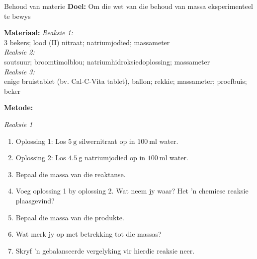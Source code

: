             \begin{i_experiment}{Behoud van materie}
            \nopagebreak
            \label{m38711*eip-453}\noindent{}\textbf{Doel:}
Om die wet van die behoud van massa eksperimenteel te bewys
\par 
\label{m38711*eip792}\noindent{}\textbf{Materiaal:}
\textsl{Reaksie 1:} \\
3 bekers; lood (II) nitraat; natriumjodied; massameter \\
\textsl{Reaksie 2:} \\
 soutsuur; broomtimolblou; natriumhidroksiedoplossing; massameter \\
 \textsl{Reaksie 3:} \\
enige bruistablet (bv. Cal-C-Vita tablet), ballon; rekkie; massameter; proefbuis; beker
\par 
\label{m38711*eip-153}
	\par
      \label{m38711*id72432}\noindent
\textbf{Metode:} \\
\begin{minipage}{.6\textwidth}
\textsl{Reaksie 1} 
\label{m38711*id6342}\begin{enumerate}[noitemsep, label=\textbf{\arabic*}. ] 
            \item Oplossing 1: Los $5~\text{g}$ silwernitraat op in $100~\text{ml}$ water.
\item Oplossing 2: Los $4.5~\text{g}$ natriumjodied op in $100~\text{ml}$ water.
\item Bepaal die massa van die reaktanse.
\item Voeg oplossing 1 by oplossing 2. Wat neem jy waar? Het 'n chemiese reaksie plaasgevind? 
\item Bepaal die massa van die produkte. 
\item Wat merk jy op met betrekking tot die massas?
\item Skryf 'n gebalanseerde vergelyking vir hierdie reaksie neer.
\end{enumerate}
\end{minipage}
\begin{minipage}{.4\textwidth}
 \begin{center}
\end{center}
\end{minipage}
\end{i_experiment}
